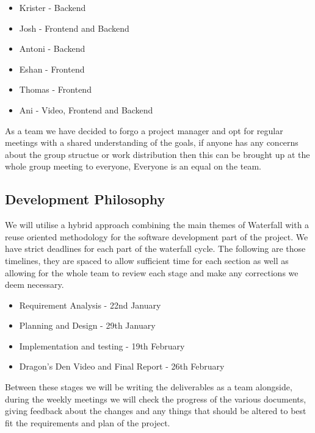\documentclass{article}
\begin{document}
\begin{itemize}
  \item Krister - Backend 
  \item Josh - Frontend and Backend 
  \item Antoni - Backend 
  \item Eshan -  Frontend
  \item Thomas - Frontend
  \item Ani - Video, Frontend and Backend
\end{itemize}

As a team we have decided to forgo a project manager and opt for regular meetings 
with a shared understanding of the goals, if anyone has any concerns about the group 
structue or work distribution then this can be brought up at the whole group meeting 
to everyone, Everyone is an equal on the team.

\subsection{Development Philosophy}
We will utilise a hybrid approach combining the main themes of Waterfall with a 
reuse oriented methodology for the software development part of the project. We 
have strict deadlines for each part of the waterfall cycle. The following are 
those timelines, they are spaced to allow sufficient time for each section as 
well as allowing for the whole team to review each stage and make any corrections 
we deem necessary. 

\begin{itemize}
  \item Requirement Analysis
        - 22nd January
  \item Planning and Design
        - 29th January
  \item Implementation and testing
        - 19th February
  \item Dragon's Den Video and Final Report
        - 26th February
\end{itemize}

Between these stages we will be writing the deliverables as a team alongside,
during the weekly meetings we will check the progress of the various documents,
giving feedback about the changes and any things that should be altered to best 
fit the requirements and plan of the project.
\end{document}
